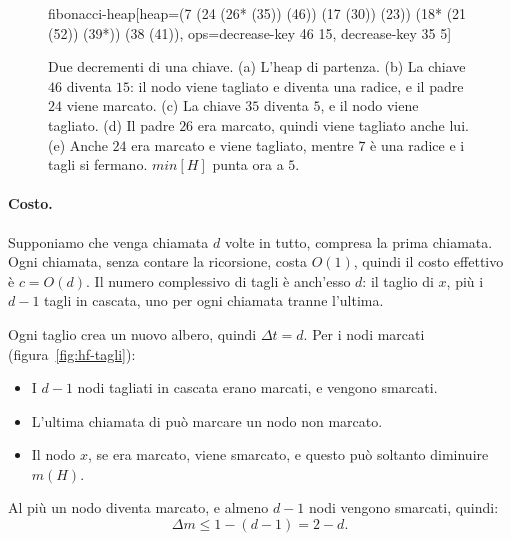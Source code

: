 \begin{figure}[htbp]
\begin{widget}{fibonacci-heap}[heap={(7 (24 (26* (35)) (46)) (17 (30)) (23)) (18* (21 (52)) (39*)) (38 (41))}, ops={decrease-key 46 15, decrease-key 35 5}]
\end{widget}
\caption{Due decrementi di una chiave. (a) L'heap di partenza. (b) La chiave $46$ diventa $15$: il nodo viene tagliato e diventa una radice, e il padre $24$ viene marcato. (c) La chiave $35$ diventa $5$, e il nodo viene tagliato. (d) Il padre $26$ era marcato, quindi viene tagliato anche lui. (e) Anche $24$ era marcato e viene tagliato, mentre $7$ è una radice e i tagli si fermano. $\mathit{min}[H]$ punta ora a $5$.}
\label{fig:hf-decremento}
\end{figure}

\paragraph{Costo.}
Supponiamo che \CascadingCut{} venga chiamata $d$ volte in tutto, compresa la prima chiamata. Ogni chiamata, senza contare la ricorsione, costa $O(1)$, quindi il costo effettivo è $c = O(d)$. Il numero complessivo di tagli è anch'esso $d$: il taglio di $x$, più i $d - 1$ tagli in cascata, uno per ogni chiamata tranne l'ultima.

Ogni taglio crea un nuovo albero, quindi $\Delta t = d$. Per i nodi marcati (figura~\ref{fig:hf-tagli}):
\begin{itemize}
    \item I $d - 1$ nodi tagliati in cascata erano marcati, e vengono smarcati.
    \item L'ultima chiamata di \CascadingCut{} può marcare un nodo non marcato.
    \item Il nodo $x$, se era marcato, viene smarcato, e questo può soltanto diminuire $m(H)$.
\end{itemize}
Al più un nodo diventa marcato, e almeno $d - 1$ nodi vengono smarcati, quindi:
\[
\Delta m \le 1 - (d - 1) = 2 - d.
\]

